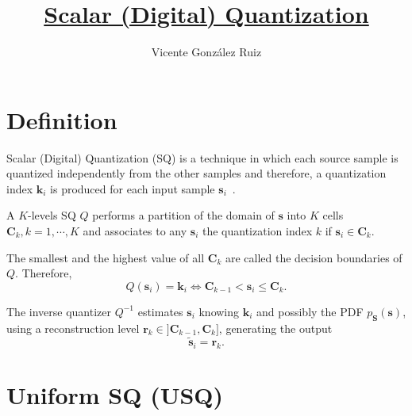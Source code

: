 
\title{\href{https://github.com/vicente-gonzalez-ruiz/scalar_quantization}{Scalar (Digital) Quantization}}

\author{Vicente González Ruiz}

\maketitle
\tableofcontents

\section{Definition}


Scalar (Digital) Quantization (SQ) is a technique in which each source
sample is quantized independently from the other samples and
therefore, a quantization index ${\mathbf k}_i$ is produced for each
input sample ${\mathbf s}_i$~\cite{vruiz__quantization}.

A $K$-levels SQ $Q$ performs a partition of the domain of ${\mathbf
  s}$ into $K$ cells ${\mathbf C}_k, k = 1, \cdots, K$ and associates
to any ${\mathbf s}_i$ the quantization index $k$ if ${\mathbf s}_i\in
{\mathbf C}_k$.

The smallest and the highest value of all ${\mathbf C}_k$ are called
the decision boundaries of $Q$. Therefore,
\begin{equation}
  Q({\mathbf s}_i) = {\mathbf k}_i \Leftrightarrow {\mathbf C}_{k-1} <
  {\mathbf s}_i \le {\mathbf C}_k.
\end{equation}

The inverse quantizer $Q^{-1}$ estimates ${\mathbf s}_i$ knowing
${\mathbf k}_i$ and possibly the PDF $p_{\mathbf S}({\mathbf s})$,
using a reconstruction level ${\mathbf r}_k\in ]{\mathbf C}_{k-1},
  {\mathbf C}_k]$, generating the output
\begin{equation}
  \tilde{\mathbf s}_i = {\mathbf r}_k.
\end{equation}


\section{Uniform SQ (USQ)}

